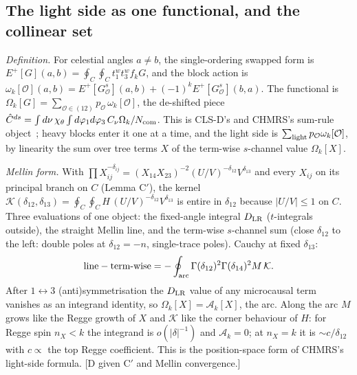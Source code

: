 \documentclass[aps,prl,onecolumn,superscriptaddress,nofootinbib]{revtex4-2}
\begin{document}
\subsection{The light side as one functional, and the collinear set}
\label{sec:arc}
\emph{Definition.} For celestial angles $a\neq b$, the single-ordering swapped form is
$E^+[G](a,b)=\oint_C\oint_C t_1^wt_3^wf_kG$, and the block action is
$\omega_k[\mathcal O](a,b)=E^+[G^s_{\mathcal O}](a,b)+(-1)^kE^+[G^s_{\mathcal O}](b,a)$. The
functional is $\Omega_k[G]=\sum_{\mathcal O\in(12)}p_{\mathcal O}\,\omega_k[\mathcal O]$, the
de-shifted piece $\hat C^{ds}=\int d\nu\,\chi_\theta\int d\varphi_1d\varphi_3\,C_\nu\Omega_k/N_{\rm com}$.
This is CLS-D's and CHMRS's sum-rule object~\cite{CLSD,CHMRS}; heavy blocks enter it one at a time, and the light
side is $\sum_{\rm light}p_{\mathcal O}\omega_k[\mathcal O]$, by linearity the sum over tree terms
$X$ of the term-wise $s$-channel value $\Omega_k[X]$.

\emph{Mellin form.} With
$\prod X_{ij}^{-\delta_{ij}}=(X_{14}X_{23})^{-2}(U/V)^{-\delta_{12}}V^{\delta_{13}}$ and every
$X_{ij}$ on its principal branch on $C$ (Lemma C$'$), the kernel
$\mathcal K(\delta_{12},\delta_{13})=\oint_C\oint_C H\,(U/V)^{-\delta_{12}}V^{\delta_{13}}$ is entire
in $\delta_{12}$ because $|U/V|\le1$ on $C$. Three evaluations of one object: the fixed-angle
integral $D_{\rm LR}$ ($t$-integrals outside), the straight Mellin line, and the term-wise
$s$-channel sum (close $\delta_{12}$ to the left: double poles at $\delta_{12}=-n$, single-trace
poles). Cauchy at fixed $\delta_{13}$:
\begin{equation}
\text{line}-\text{term-wise}=-\oint_{\rm arc}\Gamma(\delta_{12})^2\Gamma(\delta_{14})^2M\,\mathcal K .
\end{equation}
After $1\leftrightarrow3$ (anti)symmetrisation the $D_{\rm LR}$ value of any microcausal term
vanishes as an integrand identity, so $\Omega_k[X]=\mathcal A_k[X]$, the arc. Along the arc $M$
grows like the Regge growth of $X$ and $\mathcal K$ like the corner behaviour of $H$: for Regge
spin $n_X<k$ the integrand is $o(|\delta|^{-1})$ and $\mathcal A_k=0$; at $n_X=k$ it is
$\sim c/\delta_{12}$ with $c\propto$ the top Regge coefficient. This is the position-space form
of CHMRS's light-side formula. [D given C$'$ and Mellin convergence.]
\end{document}
